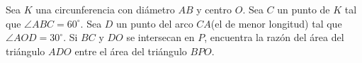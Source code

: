 Sea $K$ una circunferencia con diámetro $AB$ y centro $O$. Sea $C$ un punto de $K$ tal que $\angle ABC = 60^\circ$. Sea $D$ un punto del arco $CA $(el de menor longitud) tal que $\angle AOD = 30^\circ$. Si $BC$ y $DO$ se intersecan en $P$, encuentra la razón del área del triángulo $ADO$ entre el área del triángulo $BPO$.